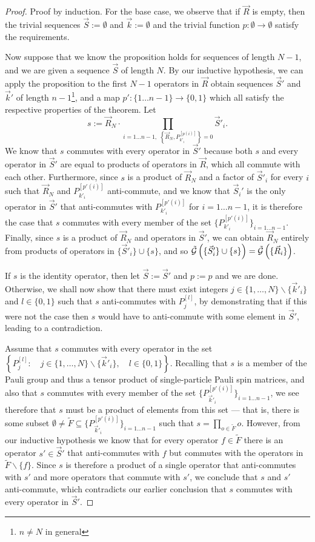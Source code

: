 \documentclass[twocolumn,showpacs,preprintnumbers,amsmath,amssymb,nofootinbib,pra,floatfix]{revtex4-1}
\newcommand{\lst}{\vec}
\newcommand{\set}{\tilde}
\newcommand{\genfun}{\tilde{\mathcal{G}}}
\begin{document}
\begin{proof}
Proof by induction.  For the base case, we observe that if $\lst R$ is empty, then the trivial sequences $\lst S:=\emptyset$ and $\lst k :=\emptyset$ and the trivial function $p:\emptyset\to\emptyset$ satisfy the requirements.

Now suppose that we know the proposition holds for sequences of length $N-1$, and we are given a sequence $\lst S$ of length $N$.  By our inductive hypothesis, we can apply the proposition to the first $N-1$ operators in $\lst R$ obtain sequences $\lst S'$ and $\lst k'$ of length $n-1$\footnote{$n\ne N$ in general}, and a map $p':\{1\dots n-1\}\to \{0,1\}$ which all satisfy the respective properties of the theorem.  Let $$s:=\lst R_N\cdot \prod_{i=1\dots n-1, \,\,\left\{\lst R_N,P_{k'_i}^{[p(i)]}\right\}=0} \lst S'_i.$$  We know that $s$ commutes with every operator in $\lst S'$ because both $s$ and every operator in $\lst S'$ are equal to products of operators in $\lst R$, which all commute with each other.  Furthermore, since $s$ is a product of $\lst R_N$ and a factor of $\lst S'_i$ for every $i$ such that $\lst R_N$ and $P_{k'_i}^{[p'(i)]}$ anti-commute, and we know that $\lst S_i'$ is the only operator in $\lst S'$ that anti-commutes with $P_{k'_i}^{[p'(i)]}$ for $i=1\dots n-1$, it is therefore the case that $s$ commutes with every member of the set $\{P_{k'_i}^{[p'(i)]}\}_{i=1\dots n-1}$.  Finally, since $s$ is a product of $\lst R_N$ and operators in $\lst S'$, we can obtain $\lst R_N$ entirely from products of operators in $\{\lst S'_i\} \cup \{s\}$, and so $\genfun\paren{\{\lst S'_i\} \cup \{s\}}=\genfun\paren{\{\lst R_i\}}$.

If $s$ is the identity operator, then let $\lst S:=\lst S'$ and $p:=p$ and we are done.  Otherwise, we shall now show that there must exist integers $j\in\{1,\dots,N\}\backslash\{\lst k'_i\}$ and $l\in\{0,1\}$ such that $s$ anti-commutes with $P_{j}^{[l]}$, by demonstrating that if this were not the case then $s$ would have to anti-commute with some element in $\lst S'$, leading to a contradiction.

Assume that $s$ commutes with every operator in the set $\left\{P_j^{[l]}:\quad j\in\{1,\dots,N\}\backslash\{\lst k'_i\}, \quad l\in\{0,1\}\right\}.$  Recalling that $s$ is a member of the Pauli group and thus a tensor product of single-particle Pauli spin matrices, and also that $s$ commutes with every member of the set $\{P_{\lst k'_i}^{[p'(i)]}\}_{i=1\dots n-1}$, we see therefore that $s$ must be a product of elements from this set --- that is, there is some subset $\emptyset \ne \set F \subseteq \{P_{\lst k'_i}^{[p'(i)]}\}_{i=1\dots n-1}$ such that $s=\prod_{o\in \set F} o$.  However, from our inductive hypothesis we know that for every operator $f\in\set F$ there is an operator $s'\in\lst S'$ that anti-commutes with $f$ but commutes with the operators in $\set F\backslash\{f\}$.  Since $s$ is therefore a product of a single operator that anti-commutes with $s'$ and more operators that commute with $s'$, we conclude that $s$ and $s'$ anti-commute, which contradicts our earlier conclusion that $s$ commutes with every operator in $\lst S'$.


\end{proof}
\end{document}
